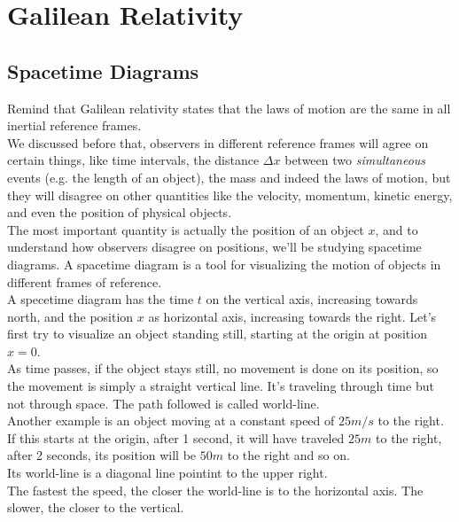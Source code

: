 \section{Galilean Relativity}

\subsection{Spacetime Diagrams}

Remind that Galilean relativity states that the laws of motion are the same in all inertial reference frames.\\
We discussed before that, observers in different reference frames will agree on certain things, like time intervals, the distance $\Delta x$ between two \textit{simultaneous} events (e.g. the length of an object), the mass and indeed the laws of motion, but
they will disagree on other quantities like the velocity, momentum, kinetic energy, and even the position of physical objects.\\

The most important quantity is actually the position of an object $x$, and to understand how observers disagree on positions, we'll be 
studying spacetime diagrams.
A spacetime diagram is a tool for visualizing the motion of objects in different frames of reference.\\

A specetime diagram has the time $t$ on the vertical axis, increasing towards north, and the position $x$ as horizontal axis, increasing towards the right.
Let's first try to visualize an object standing still, starting at the origin at position $x = 0$.\\
As time passes, if the object stays still, no movement is done on its position, so the movement is simply a straight vertical line. It's traveling
through time but not through space. The path followed is called world-line. \\

Another example is an object moving at a constant speed of $25 m/s$ to the right. If this starts at the origin, after 1 second, 
it will have traveled $25 m$ to the right, after 2 seconds, its position will be $50 m$ to the right and so on.\\
Its world-line is a diagonal line pointint to the upper right.\\

The fastest the speed, the closer the world-line is to the horizontal axis. The slower, the closer to the vertical.\\

